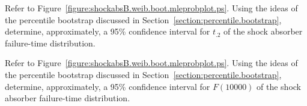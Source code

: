 \begin{exercise}
Refer to Figure~\ref{figure:shockabsB.weib.boot.mleprobplot.ps}.
Using the ideas of the percentile bootstrap discussed in
Section~\ref{section:percentile.bootstrap}, determine,
approximately, a 95\% confidence interval for $t_{.2}$ of the shock
absorber failure-time distribution.
\end{exercise}

\begin{exercise}
Refer to Figure~\ref{figure:shockabsB.weib.boot.mleprobplot.ps}.
Using the ideas of the percentile bootstrap discussed in
Section~\ref{section:percentile.bootstrap}, determine,
approximately, a 95\% confidence interval for $F(10000)$ of the shock
absorber failure-time distribution.
\end{exercise}